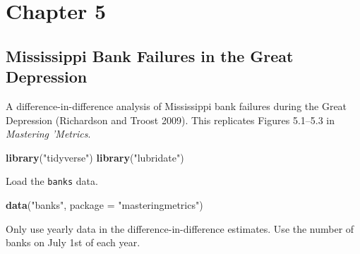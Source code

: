 \documentclass[]{book}
\newenvironment{Shaded}{\begin{snugshade}}{\end{snugshade}}
\newcommand{\DataTypeTok}[1]{\textcolor[rgb]{0.13,0.29,0.53}{#1}}
\newcommand{\KeywordTok}[1]{\textcolor[rgb]{0.13,0.29,0.53}{\textbf{#1}}}
\newcommand{\NormalTok}[1]{#1}
\newcommand{\OperatorTok}[1]{\textcolor[rgb]{0.81,0.36,0.00}{\textbf{#1}}}
\newcommand{\StringTok}[1]{\textcolor[rgb]{0.31,0.60,0.02}{#1}}
\theoremstyle{definition}
\theoremstyle{definition}
\theoremstyle{definition}
\theoremstyle{remark}
\begin{document}
\hypertarget{part-chapter-5}{%
\part{Chapter 5}\label{part-chapter-5}}

\hypertarget{mississippi-bank-failures-in-the-great-depression}{%
\chapter{Mississippi Bank Failures in the Great
Depression}\label{mississippi-bank-failures-in-the-great-depression}}

A difference-in-difference analysis of Mississippi bank failures during
the Great Depression (Richardson and Troost 2009). This replicates
Figures 5.1--5.3 in \emph{Mastering 'Metrics}.

\begin{Shaded}
\begin{Highlighting}[]
\KeywordTok{library}\NormalTok{(}\StringTok{"tidyverse"}\NormalTok{)}
\KeywordTok{library}\NormalTok{(}\StringTok{"lubridate"}\NormalTok{)}
\end{Highlighting}
\end{Shaded}

Load the \texttt{banks} data.

\begin{Shaded}
\begin{Highlighting}[]
\KeywordTok{data}\NormalTok{(}\StringTok{"banks"}\NormalTok{, }\DataTypeTok{package =} \StringTok{"masteringmetrics"}\NormalTok{)}
\end{Highlighting}
\end{Shaded}

Only use yearly data in the difference-in-difference estimates. Use the
number of banks on July 1st of each year.

\begin{Shaded}
\end{Shaded}
\end{document}
